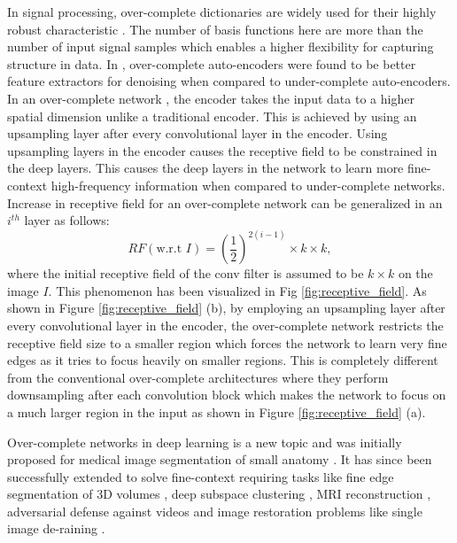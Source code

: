 \documentclass[journal]{IEEEtran}
\begin{document}
 In signal processing, over-complete dictionaries are widely used for their highly robust characteristic \cite{lewicki2000learning}. The number of basis functions  here are more than the number of input signal samples which enables a higher flexibility for capturing structure in data. In \cite{vincent2008extracting}, over-complete auto-encoders were  found to be better feature extractors for denoising when compared to under-complete auto-encoders. In an over-complete network \cite{valanarasu2020kiu}, the encoder takes the input data to a higher spatial dimension unlike a traditional encoder. This is achieved by using an upsampling layer after every convolutional layer in the encoder. Using upsampling layers in the encoder causes the receptive field to be constrained in the deep layers. This causes the deep layers in the network to learn more fine-context high-frequency information when compared to under-complete networks. Increase in receptive field for an over-complete network can be generalized in an $i^{th}$ layer  as follows:  
 \begin{equation}
    RF (\text{w.r.t } I) =  \left(\frac{1}{2}\right)^{2(i-1)} \times k \times k,
 \end{equation}
 where the initial receptive field of the conv filter is assumed to be $k \times k$ on the image $I$. This phenomenon has been visualized in Fig \ref{fig:receptive_field}. As shown in Figure \ref{fig:receptive_field} (b), by employing an upsampling layer after every convolutional layer in the encoder, the over-complete network restricts the receptive field size to a smaller region which forces the network to learn very fine edges as it tries to focus heavily on smaller regions. This is completely different from the conventional over-complete architectures where they perform downsampling after each convolution block which makes the network to focus on a much larger region in the input as shown in Figure \ref{fig:receptive_field} (a).
 \par Over-complete networks in deep learning is a new topic and was initially proposed for  medical image segmentation of small anatomy \cite{valanarasu2020kiu}. It has since been successfully extended to solve fine-context requiring tasks like fine edge segmentation of 3D volumes \cite{valanarasu2020kiu2}, deep subspace clustering \cite{valanarasu2021overcomplete}, MRI reconstruction \cite{guo2021overandunder}, adversarial defense against videos \cite{lo2020overcomplete} and image restoration problems like single image de-raining \cite{yasarla2020exploring}.
\end{document}
